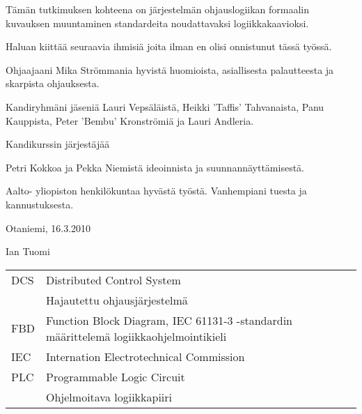 \documentclass[finnish,12pt]{article}
\begin{document}
	
	


	\author{Ian Tuomi}
	\date{5.12.2012}
	\makecoverpage

	\begin{abstractpage}[finnish]
  
Tämän tutkimuksen kohteena on järjestelmän ohjauslogiikan formaalin kuvauksen muuntaminen standardeita noudattavaksi logiikkakaavioksi.
  
	\end{abstractpage}

	\newpage
	\vspace{10cm}

Haluan kiittää seuraavia ihmisiä joita ilman en olisi onnistunut tässä työssä.

Ohjaajaani Mika Strömmania hyvistä huomioista,  asiallisesta palautteesta ja skarpista ohjauksesta.

Kandiryhmäni jäseniä Lauri Vepsäläistä, Heikki 'Taffis' Tahvanaista, Panu Kauppista, Peter 'Bembu'  Kronströmiä ja Lauri Andleria.

Kandikurssin järjestäjää 

Petri Kokkoa ja Pekka Niemistä ideoinnista ja suunnannäyttämisestä.

Aalto- yliopiston henkilökuntaa hyvästä työstä.
Vanhempiani tuesta ja kannustuksesta.
\\

	\vspace{5cm}

Otaniemi, 16.3.2010

	\vspace{5mm}
	{\hfill Ian Tuomi \hspace{1cm}}

	\newpage


	\tableofcontents



	\begin{tabular}{ll}
DCS        & Distributed Control System \\
	     & Hajautettu ohjausjärjestelmä \\
FBD         & Function Block Diagram, IEC 61131-3 -standardin määrittelemä logiikkaohjelmointikieli\\
IEC          & Internation Electrotechnical Commission \\
PLC         & Programmable Logic Circuit \\
	      & Ohjelmoitava logiikkapiiri \\

	\end{tabular}
\end{document}
